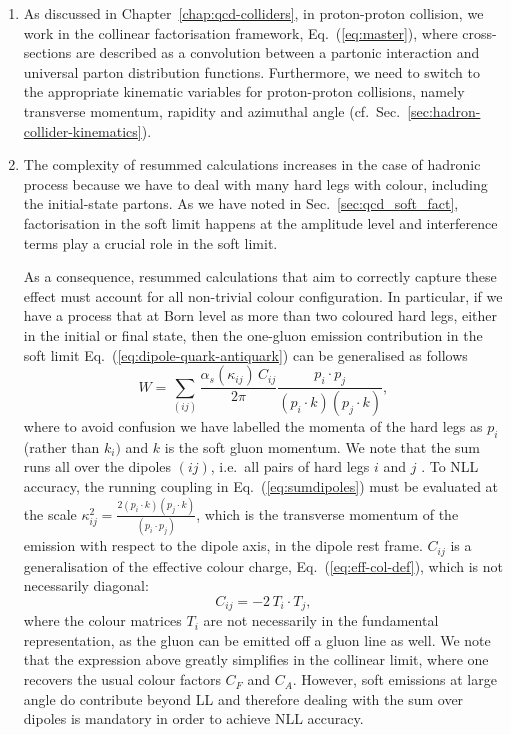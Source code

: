\begin{enumerate}[label=\alph*)]
%
\item As discussed in Chapter~\ref{chap:qcd-colliders}, in proton-proton collision, we work
  in the collinear factorisation framework, Eq.~(\ref{eq:master}),
  where cross-sections are described as a convolution between a
  partonic interaction and universal parton distribution functions.
  Furthermore, we need to switch to the appropriate kinematic
  variables for proton-proton collisions, namely transverse momentum,
  rapidity and azimuthal angle
  (cf.~Sec.~\ref{sec:hadron-collider-kinematics}).
\item The complexity of resummed calculations increases in the case of
  hadronic process because we have to deal with many hard legs with
  colour, including the initial-state partons. As we have noted in Sec.~\ref{sec:qcd_soft_fact}, factorisation in the soft limit happens at the amplitude level and interference terms play a crucial role in the soft limit. 

As a consequence, resummed calculations that aim to correctly capture these effect must account for all non-trivial colour configuration. 
%
In particular, if we have a process that at Born level as more than two coloured hard legs, either in the initial or final state, then the one-gluon emission contribution in the soft limit Eq.~(\ref{eq:dipole-quark-antiquark}) can be generalised as follows
\begin{equation} \label{eq:sumdipoles}
W= \sum_{(ij)}\frac{\alpha_s(\kappa_{ij}) \, C_{ij}}{2 \pi} \frac{p_i \cdot p_j}{(p_i \cdot k) (p_j \cdot k)},
\end{equation}
where to avoid confusion we have labelled the momenta of the hard legs as $p_i$ (rather than $k_i)$ and $k$ is the soft gluon momentum. We note that the sum runs all over the dipoles $(ij)$, i.e.\ all pairs of hard legs $i$ and $j$ . To NLL accuracy, the running coupling in Eq.~(\ref{eq:sumdipoles}) must be evaluated at the scale $\kappa_{ij}^2= \frac{2(p_i \cdot k) (p_j \cdot k)}{(p_i \cdot p_j)}$, which is the transverse momentum of the emission with respect to the dipole axis, in the dipole rest frame. $C_{ij}$ is a generalisation of the effective colour charge, Eq.~(\ref{eq:eff-col-def}), which is not necessarily diagonal:
\begin{equation}\label{eq:effective_colour}
C_{ij}=-2 \, T_i \cdot T_j,
\end{equation}
where the colour matrices $T_i$ are not necessarily in the fundamental representation, as the gluon can be emitted off a gluon line as well.
We note that the expression above greatly simplifies in the collinear limit, where one recovers the usual colour factors $C_F$ and $C_A$. However, soft emissions at large angle do contribute beyond LL and therefore dealing with the sum over dipoles is mandatory in order to achieve NLL accuracy. 


\end{enumerate}

